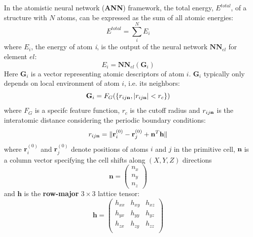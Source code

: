 \documentclass[final,1p,times]{elsarticle}
\begin{document}
In the atomistic neural network (\textbf{ANN}) framework, the total energy, 
$E^{total}$, of a structure with $N$ atoms, can be expressed as the sum of all 
atomic energies:
\begin{equation}
\label{eq:general_e_total}
E^{total} = \sum_{i}^{N}{E_i}
\end{equation}
where $E_{i}$, the energy of atom \textit{i}, is the output of the neural 
network $\mathbf{NN}_{el}$ for element $el$:
\begin{equation}
E_i = \mathbf{NN}_{el}\left( \mathbf{G}_i \right)
\end{equation} 
Here $\mathbf{G}_i$ is a vector representing atomic descriptors of atom $i$. 
$\mathbf{G}_i$ typically only depends on local environment of atom $i$, i.e.  
its neighbors:
\begin{equation}
\mathbf{G}_i = F_G(\left\{ r_{ij\mathbf{n}}, |r_{ij\mathbf{n}}| < r_c\right\} )
\end{equation}
where $F_G$ is a specifc feature function, $r_c$ is the cutoff radius and 
$r_{ij\mathbf{n}}$ is the interatomic distance considering the periodic boundary 
conditions: 
\begin{equation}
    \label{eq:rijn}
    r_{ij\mathbf{n}} = \Vert \mathbf{r}_i^{(0)} - \mathbf{r}_j^{(0)} + 
    \mathbf{n}^T \mathbf{h} \Vert
\end{equation}
where $\mathbf{r}_i^{(0)}$ and $\mathbf{r}_j^{(0)}$ denote positions of atoms 
$i$ and $j$ in the primitive cell, $\mathbf{n}$ is a column vector specifying 
the cell shifts along $(X,Y,Z)$ directions
\begin{equation}
    \label{eq:ij_shift}
    \mathbf{n} = \begin{pmatrix}
        n_x \\
        n_y \\
        n_z
    \end{pmatrix}
\end{equation}
and $\mathbf{h}$ is the \textbf{row-major} $3 \times 3$ lattice tensor:
\begin{equation}
    \label{eq:lattice}
    \mathbf{h} = \begin{pmatrix}
        h_{xx} & h_{xy} & h_{xz} \\
        h_{yx} & h_{yy} & h_{yz} \\
        h_{zx} & h_{zy} & h_{zz} \\
    \end{pmatrix}
\end{equation}
\end{document}
